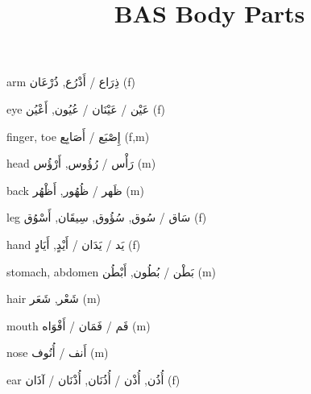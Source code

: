 \documentclass[avery5371,grid,frame]{flashcards}
\title{BAS Body Parts}
\newcommand{\ta}[1]{\textarabic{\larger[2] #1}}
\begin{document}

\begin{flashcard}{\LARGE arm}
\LARGE \ta{ذِرَاع / أَذْرُع, ذُرْعَان} (f)
\end{flashcard}
\begin{flashcard}{\LARGE eye}
\LARGE \ta{عَيْن / عَيْنَان / عُيُون, أَعْيُن} (f)
\end{flashcard}
\begin{flashcard}{\LARGE finger, toe}
\LARGE \ta{إِصْبَع / أَصَابِع} (f,m)
\end{flashcard}
\begin{flashcard}{\LARGE head}
\LARGE \ta{رَأْس / رُؤُوس, أَرْؤُس} (m)
\end{flashcard}
\begin{flashcard}{\LARGE back}
\LARGE \ta{ظَهر / ظُهُور, أَظْهُر} (m)
\end{flashcard}
\begin{flashcard}{\LARGE leg}
\LARGE \ta{سَاق / سُوق, سُؤُوق, سِيقَان, أَسْوُق} (f)
\end{flashcard}
\begin{flashcard}{\LARGE hand}
\LARGE \ta{يَد / يَدَان / أَيْدٍ, أَيَادٍ} (f)
\end{flashcard}
\begin{flashcard}{\LARGE stomach, abdomen}
\LARGE \ta{بَطْن / بُطُون, أَبْطُن} (m)
\end{flashcard}
\begin{flashcard}{\LARGE hair}
\LARGE \ta{شَعْر, شَعَر} (m)
\end{flashcard}
\begin{flashcard}{\LARGE mouth}
\LARGE \ta{فَم / فَمَان / أَفْوَاه} (m)
\end{flashcard}
\begin{flashcard}{\LARGE nose}
\LARGE \ta{أَنف / أُنُوف} (m)
\end{flashcard}
\begin{flashcard}{\LARGE ear}
\LARGE \ta{أُذُن, أُذْن / أُذُنَان, أُذْنَان / آذَان} (f)
\end{flashcard}
\end{document}
